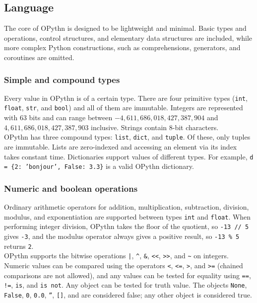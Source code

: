 \documentclass[11pt, twoside]{article}
\newcommand{\ms}{\texttt}
\begin{document}
    \subsection{Language}
    The core of OPythn is designed to be lightweight and minimal. Basic types and operations, control structures, and elementary data structures are included, while more complex Python constructions, such as comprehensions, generators, and coroutines are omitted.
    \subsubsection{Simple and compound types}
    Every value in OPythn is of a certain type. There are four primitive types (\ms{int}, \ms{float}, \ms{str}, and \ms{bool}) and all of them are immutable. Integers are represented with 63 bits and can range between $-4,611,686,018,427,387,904$ and $4,611,686,018,427,387,903$ inclusive. Strings contain 8-bit characters.\\
    \indent OPythn has three compound types: \ms{list}, \ms{dict}, and \ms{tuple}. Of these, only tuples are immutable. Lists are zero-indexed and accessing an element via its index takes constant time. Dictionaries support values of different types. For example, \ms{d = \{2: 'bonjour', False: 3.3\}} is a valid OPythn dictionary.
   
    \subsubsection{Numeric and boolean operations}
    Ordinary arithmetic operators for addition, multiplication, subtraction, division, modulus, and exponentiation are supported between types \ms{int} and \ms{float}. When performing integer division, OPythn takes the floor of the quotient, so \ms{-13 // 5} gives \ms{-3}, and the modulus operator always gives a positive result, so \ms{-13 \% 5} returns \ms{2}.\\
    \indent OPythn supports the bitwise operations \ms{|}, \ms{\^}, \ms{\&}, \ms{<<}, \ms{>>}, and \ms{\~} on integers. Numeric values can be compared using the operators \ms{<}, \ms{<=}, \ms{>}, and \ms{>=} (chained comparisons are not allowed), and any values can be tested for equality using \ms{==}, \ms{!=}, \ms{is}, and \ms{is not}. Any object can be tested for truth value. The objects \ms{None}, \ms{False}, \ms{0}, \ms{0.0}, \ms{''}, \ms{[]}, and \ms{\string{\string}} are considered false; any other object is considered true.
\end{document}
